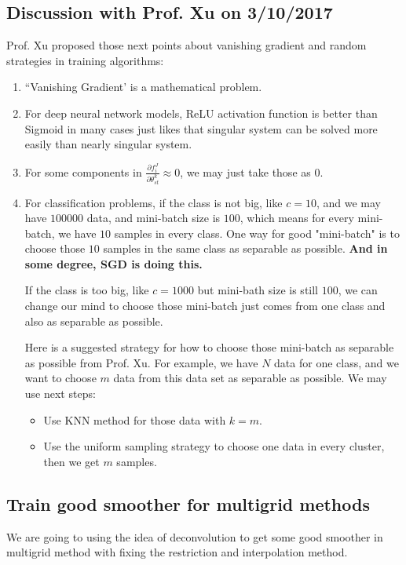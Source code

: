 \subsection{Discussion with Prof. Xu on 3/10/2017}
Prof. Xu proposed those next points about vanishing gradient and random strategies in training algorithms:
\begin{enumerate}
\item ``Vanishing Gradient' is a mathematical problem. 

\item For deep neural network models, ReLU activation function is better than Sigmoid in many cases just likes that singular system can be solved more easily than nearly singular system. 

\item For some components in $\frac{\partial f^J_i}{\partial \theta^k_{st}} \approx 0$, we may just take those as 0.

\item For classification problems, if the class is not big, like $c = 10$, and we may have $100000$ data, and mini-batch size is $100$, which means for every mini-batch, we have $10$ samples in every class. One way for good "mini-batch" is to choose those $10$ samples in the same class as separable as possible. {\bf And in some degree, SGD is doing this. }

If the class is too big, like $c = 1000$ but mini-bath size is still $100$, we can change our mind to choose those mini-batch just comes from one class and also as separable as possible. 

Here is a suggested strategy for how to choose those mini-batch  as separable as possible from Prof. Xu. For example, we have $N$ data for one class, and we want to choose $m$ data from this data set  as separable as possible. We may use next steps:
\begin{itemize}
\item Use KNN method for those data with $k = m$.
\item Use the uniform sampling strategy to choose one data in every cluster, then we get $m$ samples.
\end{itemize}

\end{enumerate}


\subsection{Train good smoother for multigrid methods}
We are going to using the idea of deconvolution to get some good smoother in multigrid method with fixing the restriction and interpolation method. 

